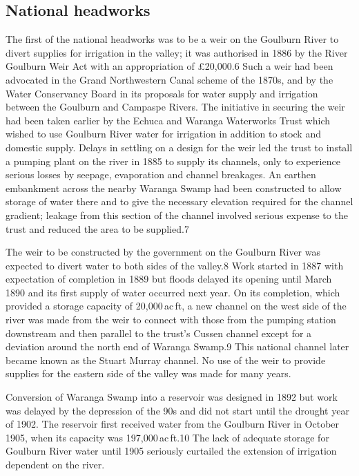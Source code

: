\subsection{National headworks}

The first of the national headworks was to be a weir on the Goulburn
River to divert supplies for irrigation in the valley; it was
authorised in 1886 by the River Goulburn Weir Act with an
appropriation of \pounds20,000.6 Such a weir had been advocated in the
Grand Northwestern Canal scheme of the 1870s, and by the Water
Conservancy Board in its proposals for water supply and irrigation
between the Goulburn and Campaspe Rivers. The initiative in securing
the weir had been taken earlier by the Echuca and Waranga Waterworks
Trust which wished to use Goulburn River water for irrigation in
addition to stock and domestic supply. Delays in settling on a design
for the weir led the trust to install a pumping plant on the river in
1885 to supply its channels, only to experience serious losses by
seepage, evaporation and channel breakages. An earthen embankment
across the nearby Waranga Swamp had been constructed to allow storage
of water there and to give the necessary elevation required for the
channel gradient; leakage from this section of the channel involved
serious expense to the trust and reduced the area to be supplied.7

The weir to be constructed by the government on the Goulburn River was
expected to divert water to both sides of the valley.8 Work started in
1887 with expectation of completion in 1889 but floods delayed its
opening until March 1890 and its first supply of water occurred next
year. On its completion, which provided a storage capacity of
20,000\,ac\,ft, a new channel on the west side of the river was made
from the weir to connect with those from the pumping station
downstream and then parallel to the trust's Cussen channel except for
a deviation around the north end of Waranga Swamp.9 This national
channel later became known as the Stuart Murray channel. No use of the
weir to provide supplies for the eastern side of the valley was made
for many years.

Conversion of Waranga Swamp into a reservoir was designed in 1892 but
work was delayed by the depression of the 90s and did not start until
the drought year of 1902.  The reservoir first received water from the
Goulburn River in October 1905, when its capacity was
197,000\,ac\,ft.10 The lack of adequate storage for Goulburn River
water until 1905 seriously curtailed the extension of irrigation
dependent on the river.

